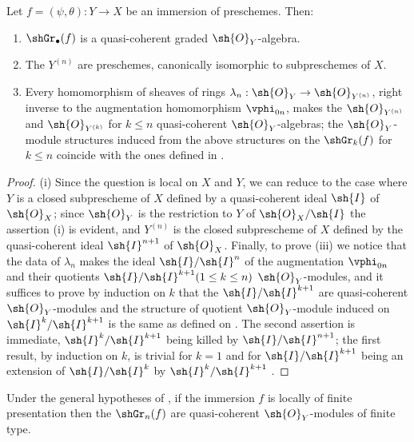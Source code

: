 \begin{proposition}[16.1.5]
\label{IV.16.1.5}
Let $f = (\psi, \theta): Y \to X$ be an immersion of preschemes.
Then:
\begin{enumerate}
  \item[{\rm(i)}] $\shGr_\bullet(f)$ is a quasi-coherent graded $\sh{O}_Y$-algebra.
  \item[{\rm(ii)}] The $Y^{(n)}$ are preschemes, canonically isomorphic to subpreschemes of $X$.
  \item[{\rm(iii)}] Every homomorphism of sheaves of rings $\lambda_n: \sh{O}_Y \to \sh{O}_{Y^{(n)}}$, right inverse to the augmentation homomorphism $\vphi_{0n}$, makes the $\sh{O}_{Y^{(n)}}$ and $\sh{O}_{Y^{(k)}}$ for $k\leq n$ quasi-coherent $\sh{O}_Y$-algebras;
  the $\sh{O}_Y$-module structures induced from the above structures on the $\shGr_k(f)$ for $k \leq n$ coincide with the ones defined in .
\end{enumerate}
\end{proposition}

\begin{proof}
(i) Since the question is local on $X$ and $Y$, we can reduce to the case where $Y$ is a closed subprescheme of $X$ defined by a quasi-coherent ideal $\sh{I}$ of $\sh{O}_X$;
since $\sh{O}_Y$ is the restriction to $Y$ of $\sh{O}_X/\sh{I}$ the assertion (i) is evident, and $Y^{(n)}$ is the closed subprescheme of $X$ defined by the quasi-coherent ideal $\sh{I}^{n+1}$ of $\sh{O}_X$.
Finally, to prove (iii) we notice that the data of $\lambda_n$ makes the ideal $\sh{I}/\sh{I}^n$ of the augmentation $\vphi_{0n}$ and their quotients $\sh{I}/\sh{I}^{k+1} (1\leq k \leq n)$ $\sh{O}_Y$-modules, and it suffices to prove by induction on $k$ that the $\sh{I}/\sh{I}^{k+1}$ are quasi-coherent $\sh{O}_Y$-modules and the structure of quotient $\sh{O}_Y$-module induced on $\sh{I}^k/\sh{I}^{k+1}$ is the same as defined on .
The second assertion is immediate, $\sh{I}^k/\sh{I}^{k+1}$ being killed by $\sh{I}/\sh{I}^{n+1}$;
the first result, by induction on $k$, is trivial for $k=1$ and for $\sh{I}/\sh{I}^{k+1}$ being an extension of $\sh{I}/\sh{I}^{k}$ by $\sh{I}^k/\sh{I}^{k+1}$ .
\end{proof}

\begin{corollary}[16.1.6]
\label{IV.16.1.6}
Under the general hypotheses of , if the immersion $f$ is locally of finite presentation then the $\shGr_n(f)$ are quasi-coherent $\sh{O}_Y$-modules of finite type.
\end{corollary}

